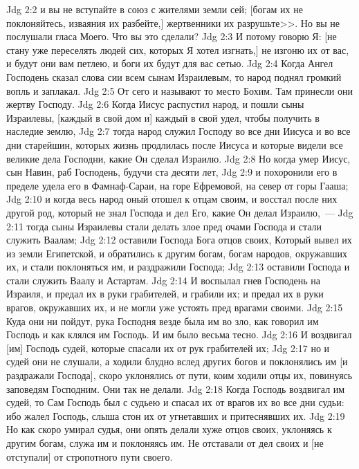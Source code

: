 \vs Jdg 2:2 и вы не вступайте в союз с жителями земли сей; [богам их не поклоняйтесь, изваяния их разбейте,] жертвенники их разрушьте>>. Но вы не послушали гласа Моего. Что вы это сделали?
\vs Jdg 2:3 И потому говорю Я: [не стану уже переселять людей сих, которых Я хотел изгнать,] не изгоню их от вас, и будут они вам петлею, и боги их будут для вас сетью.
\vs Jdg 2:4 Когда Ангел Господень сказал слова сии всем сынам Израилевым, то народ поднял громкий вопль и заплакал.
\vs Jdg 2:5 От сего и называют то место Бохим. Там принесли они жертву Господу.
\rsbpar\vs Jdg 2:6 Когда Иисус распустил народ, и пошли сыны Израилевы, [каждый в свой дом и] каждый в свой удел, чтобы получить в наследие землю,
\vs Jdg 2:7 тогда народ служил Господу во все дни Иисуса и во все дни старейшин, которых жизнь продлилась после Иисуса и которые видели все великие дела Господни, какие Он сделал Израилю.
\vs Jdg 2:8 Но когда умер Иисус, сын Навин, раб Господень, будучи ста десяти лет,
\vs Jdg 2:9 и похоронили его в пределе удела его в Фамнаф-Сараи, на горе Ефремовой, на север от горы Гааша;
\vs Jdg 2:10 и когда весь народ оный отошел к отцам своим, и восстал после них другой род, который не знал Господа и дел Его, какие Он делал Израилю,~---
\vs Jdg 2:11 тогда сыны Израилевы стали делать злое пред очами Господа и стали служить Ваалам;
\vs Jdg 2:12 оставили Господа Бога отцов своих, Который вывел их из земли Египетской, и обратились к другим богам, богам народов, окружавших их, и стали поклоняться им, и раздражили Господа;
\vs Jdg 2:13 оставили Господа и стали служить Ваалу и Астартам.
\rsbpar\vs Jdg 2:14 И воспылал гнев Господень на Израиля, и предал их в руки грабителей, и грабили их; и предал их в руки врагов, окружавших их, и не могли уже устоять пред врагами своими.
\vs Jdg 2:15 Куда они ни пойдут, рука Господня везде была им во зло, как говорил им Господь и как клялся им Господь. И им было весьма тесно.
\vs Jdg 2:16 И воздвигал [им] Господь судей, которые спасали их от рук грабителей их;
\vs Jdg 2:17 но и судей они не слушали, а ходили блудно вслед других богов и поклонялись им [и раздражали Господа], скоро уклонялись от пути, коим ходили отцы их, повинуясь заповедям Господним. Они так не делали.
\vs Jdg 2:18 Когда Господь воздвигал им судей, то Сам Господь был с судьею и спасал их от врагов их во все дни судьи: ибо жалел  Господь, слыша стон их от угнетавших и притеснявших их.
\vs Jdg 2:19 Но как скоро умирал судья, они опять делали хуже отцов своих, уклоняясь к другим богам, служа им и поклоняясь им. Не отставали от дел своих и [не отступали] от стропотного пути своего.
